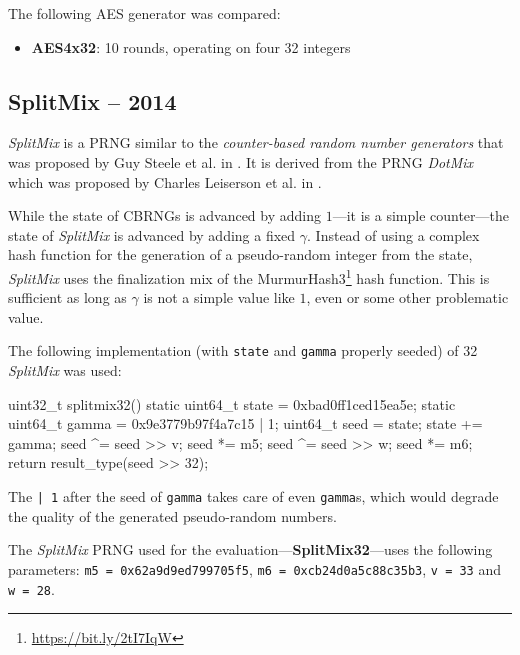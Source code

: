    The following AES generator was compared:
    \begin{itemize}
		\itemsep0em
        \item \textbf{AES4x32}: 10 rounds, operating on four \SI{32}{\bit} integers
    \end{itemize}

\subsection[SplitMix -- 2014]{SplitMix -- 2014} \label{subsec:splitmix}

    \emph{SplitMix} is a PRNG similar to the \emph{counter-based random number generators} that was proposed by Guy Steele et al. in \cite{Steele:2014}. It is derived from the PRNG \emph{DotMix} which was proposed by Charles Leiserson et al. in \cite{Leiserson:2012}.

    While the state of CBRNGs is advanced by adding $1$---it is a simple counter---the state of \emph{SplitMix} is advanced by adding a fixed $\gamma$. Instead of using a complex hash function for the generation of a pseudo-random integer from the state, \emph{SplitMix} uses the finalization mix of the MurmurHash3\footnote{\url{https://bit.ly/2tI7IqW}} hash function. This is sufficient as long as $\gamma$ is not a simple value like $1$, even or some other problematic value.

    The following implementation (with \lstinline|state| and \lstinline|gamma| properly seeded) of \SI{32}{\bit} \emph{SplitMix} was used:
\begin{@empty}
    \lstset{
        language = [ISO]C++
    }
\begin{centeredshadowboxlisting}
uint32_t splitmix32() {
    static uint64_t state = 0xbad0ff1ced15ea5e;
    static uint64_t gamma = 0x9e3779b97f4a7c15
                          | 1;
    uint64_t seed = state;
    state += gamma;
    seed ^= seed >> v;
    seed *= m5;
    seed ^= seed >> w;
    seed *= m6;
    return result_type(seed >> 32);
}
\end{centeredshadowboxlisting}
\end{@empty}
    The \lstinline{| 1} after the seed of \lstinline|gamma| takes care of even \lstinline|gamma|s, which would degrade the quality of the generated pseudo-random numbers.

    The \emph{SplitMix} PRNG used for the evaluation---\textbf{SplitMix32}---uses the following parameters: \lstinline|m5 = 0x62a9d9ed799705f5|, \lstinline|m6 = 0xcb24d0a5c88c35b3|, \lstinline|v = 33| and \lstinline|w = 28|.

